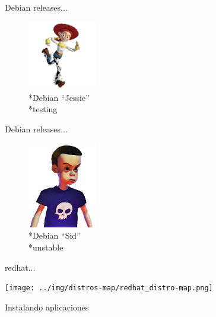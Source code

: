 \documentclass[xcolor=dvipsnames, pdf]{beamer}
\begin{document}
\begin{section}
\begin{subsection}
\begin{frame}
    \end{frame}
    
    \begin{frame}
      {Debian releases...}
      
      \begin{figure}
        \includegraphics[width=3cm]{../img/debrelease/jessie.jpg}
        \\*Debian ``Jessie'' \\*testing
      \end{figure}
      
    \end{frame}
    
    \begin{frame}
      {Debian releases...}
      
      \begin{figure}
        \includegraphics[width=3cm]{../img/debrelease/sid.jpg}
        \\*Debian ``Sid'' \\*unstable
      \end{figure}
      
    \end{frame}
    
    \begin{frame}
      {redhat...}
      
      \begin{center} 
        \texttt{[image: ../img/distros-map/redhat\_distro-map.png]} 
      \end{center}
    \end{frame}
  \end{subsection}
  
  \begin{subsection}
    {Instalando aplicaciones}
    

\end{subsection}
\end{section}
\end{document}
